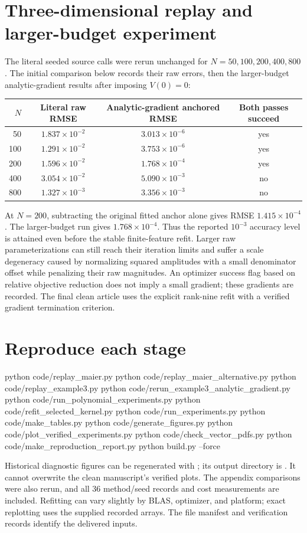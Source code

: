 \documentclass[11pt,a4paper]{article}
\begin{document}
\section*{Three-dimensional replay and larger-budget experiment}
The literal seeded source calls were rerun unchanged for $N=50,100,200,400,800$. The initial comparison below records their raw errors, then the larger-budget analytic-gradient results after imposing $V(0)=0$:
\begin{center}\small\begin{tabular}{rccc}\toprule
$N$ & Literal raw RMSE & Analytic-gradient anchored RMSE & Both passes succeed\\\midrule
50 & $1.837\times10^{-2}$ & $3.013\times10^{-6}$ & yes \\
100 & $1.291\times10^{-2}$ & $3.753\times10^{-6}$ & yes \\
200 & $1.596\times10^{-2}$ & $1.768\times10^{-4}$ & yes \\
400 & $3.054\times10^{-2}$ & $5.090\times10^{-3}$ & no \\
800 & $1.327\times10^{-3}$ & $3.356\times10^{-3}$ & no \\
\bottomrule\end{tabular}\end{center}
At $N=200$, subtracting the original fitted anchor alone gives RMSE $1.415\times10^{-4}$. The larger-budget run gives $1.768\times10^{-4}$. Thus the reported $10^{-3}$ accuracy level is attained even before the stable finite-feature refit. Larger raw parameterizations can still reach their iteration limits and suffer a scale degeneracy caused by normalizing squared amplitudes with a small denominator offset while penalizing their raw magnitudes. An optimizer success flag based on relative objective reduction does not imply a small gradient; these gradients are recorded. The final clean article uses the explicit rank-nine refit with a verified gradient termination criterion.

\section*{Reproduce each stage}
\begin{Commands}
python code/replay_maier.py
python code/replay_maier_alternative.py
python code/replay_example3.py
python code/rerun_example3_analytic_gradient.py
python code/run_polynomial_experiments.py
python code/refit_selected_kernel.py
python code/run_experiments.py
python code/make_tables.py
python code/generate_figures.py
python code/plot_verified_experiments.py
python code/check_vector_pdfs.py
python code/make_reproduction_report.py
python build.py --force
\end{Commands}
Historical diagnostic figures can be regenerated with ; its output directory is . It cannot overwrite the clean manuscript's verified plots. The appendix comparisons were also rerun, and all 36 method/seed records and cost measurements are included. Refitting can vary slightly by BLAS, optimizer, and platform; exact replotting uses the supplied recorded arrays. The file manifest and verification records identify the delivered inputs.
\end{document}
